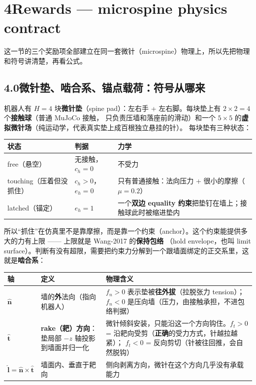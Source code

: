 \documentclass[11pt]{article}
\begin{document}
\newpage
\section*{4\quad Rewards — microspine physics contract}

这一节的三个奖励项全部建立在同一套微针（microspine）物理上，所以先把物理和符号讲清楚，再看公式。

\subsection*{4.0\quad 微针垫、啮合系、锚点载荷：符号从哪来}

机器人有 $H=4$ 块\textbf{微针垫}（spine pad）：左右手 + 左右脚。每块垫上有 $2\times2=4$ 个\textbf{接触球}（普通 MuJoCo 接触，
只负责压墙和落座前的滑动）和一个 $5\times5$ 的\textbf{虚拟微针场}（纯运动学，代表真实垫上成百根独立悬挂的针）。
每块垫有三种状态：

\begin{center}
\begin{tabular}{@{}lll@{}}
\toprule
状态 & 判据 & 力学 \\
\midrule
free（悬空） & 无接触，$c_h=0$ & 不受力 \\
touching（压着但没抓住） & $c_h>0$，$e_h=0$ & 只有普通接触：法向压力 + 很小的摩擦（$\mu=0.2$）\\
latched（锚定） & $e_h=1$ & 一个\textbf{双边 equality 约束}把垫钉在墙上；接触球此时被缩进垫内 \\
\bottomrule
\end{tabular}
\end{center}

所以“抓住”在仿真里不是靠摩擦，而是靠一个约束（anchor）。这个约束能提供多大的力有上限 —— 上限就是 Wang-2017 的\textbf{保持包络}
（hold envelope，也叫 limit surface）。判断有没有超限，需要把约束力分解到一个跟墙面绑定的正交系里，这就是\textbf{啮合系}：

\begin{center}
\begin{tabular}{@{}llp{11.5cm}@{}}
\toprule
轴 & 定义 & 物理含义 \\
\midrule
$\hat{\bm n}$ & 墙的\textbf{外}法向（指向机器人） &
  $f_n>0$ 表示垫被\textbf{往外拔}（拉脱张力 tension）；$f_n<0$ 是压向墙（压力，由接触承担，不进包络判据） \\
$\hat{\bm t}$ & \textbf{rake（耙）方向}：垫局部 $-z$ 轴投影到墙面并归一化 &
  微针倾斜安装，只能沿这一个方向钩住。$f_t>0$ = 沿耙向受剪（\textbf{正确}的受力方式，针越拉越紧）；
  $f_t<0$ = 反向剪切（针被往回推，会自然脱钩） \\
$\hat{\bm l}=\hat{\bm n}\times\hat{\bm t}$ & 墙面内、垂直于耙向 & 侧向剥离方向，微针在这个方向几乎没有承载能力 \\
\bottomrule
\end{tabular}
\end{center}
\end{document}
